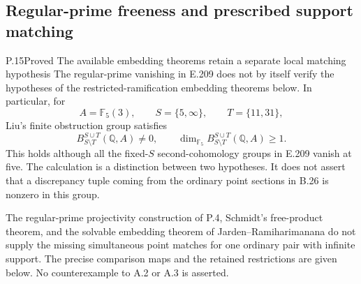 \subsection{Regular-prime freeness and prescribed support matching}

\begin{result}{P.15}{Proved}
{The available embedding theorems retain a separate local matching hypothesis}
The regular-prime vanishing in E.209 does not by itself verify the
hypotheses of the restricted-ramification embedding theorems below.
In particular, for
\[
 A=\mathbb F_5(3),\qquad S=\{5,\infty\},
 \qquad T=\{11,31\},
\]
Liu's finite obstruction group satisfies
\[
       B^{S\cup T}_{S\setminus T}(\mathbb Q,A)\ne0,
       \qquad
       \dim_{\mathbb F_5}B^{S\cup T}_{S\setminus T}(\mathbb Q,A)
          \ge1.                                                \tag{P.15.1}
\]
This holds although all the fixed-$S$ second-cohomology groups
in E.209 vanish at five. The calculation is a distinction between
two hypotheses. It does not assert that a discrepancy tuple coming
from the ordinary point sections in B.26 is nonzero in this group.

The regular-prime projectivity construction of P.4, Schmidt's
free-product theorem, and the solvable embedding theorem of
Jarden--Ramiharimanana do not supply the missing simultaneous
point matches for one ordinary pair with infinite support.
The precise comparison maps and the retained restrictions are
given below. No counterexample to A.2 or A.3 is asserted.
\end{result}

